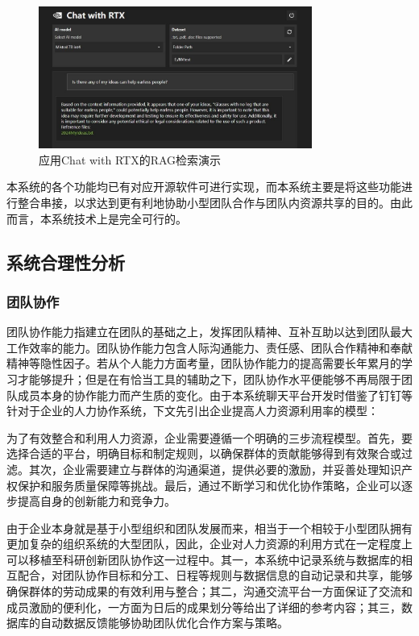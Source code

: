 \documentclass[zihao=-4]{ctexart}
\begin{document}
\begin{spacing}{1.5}
\begin{figure}[H] %
    \centering %
    \includegraphics[width=0.8\textwidth]{RAG测试1.jpg} %
    \caption{应用Chat with RTX的RAG检索演示} %
    \label{example_label} %
\end{figure}

  本系统的各个功能均已有对应开源软件可进行实现，而本系统主要是将这些功能进行整合串接，以求达到更有利地协助小型团队合作与团队内资源共享的目的。由此而言，本系统技术上是完全可行的。
\subsection{系统合理性分析}
\subsubsection{团队协作}
团队协作能力指建立在团队的基础之上，发挥团队精神、互补互助以达到团队最大工作效率的能力。团队协作能力包含人际沟通能力、责任感、团队合作精神和奉献精神等隐性因子\cite{6}。若从个人能力方面考量，团队协作能力的提高需要长年累月的学习才能够提升；但是在有恰当工具的辅助之下，团队协作水平便能够不再局限于团队成员本身的协作能力而产生质的变化。由于本系统聊天平台开发时借鉴了钉钉等针对于企业的人力协作系统，下文先引出企业提高人力资源利用率的模型：

为了有效整合和利用人力资源，企业需要遵循一个明确的三步流程模型。首先，要选择合适的平台，明确目标和制定规则，以确保群体的贡献能够得到有效聚合或过滤。其次，企业需要建立与群体的沟通渠道，提供必要的激励，并妥善处理知识产权保护和服务质量保障等挑战。最后，通过不断学习和优化协作策略，企业可以逐步提高自身的创新能力和竞争力\cite{8}。

由于企业本身就是基于小型组织和团队发展而来，相当于一个相较于小型团队拥有更加复杂的组织系统的大型团队，因此，企业对人力资源的利用方式在一定程度上可以移植至科研创新团队协作这一过程中。其一，本系统中记录系统与数据库的相互配合，对团队协作目标和分工、日程等规则与数据信息的自动记录和共享，能够确保群体的劳动成果的有效利用与整合；其二，沟通交流平台一方面保证了交流和成员激励的便利化，一方面为日后的成果划分等给出了详细的参考内容；其三，数据库的自动数据反馈能够协助团队优化合作方案与策略。

\end{spacing}
\end{document}
